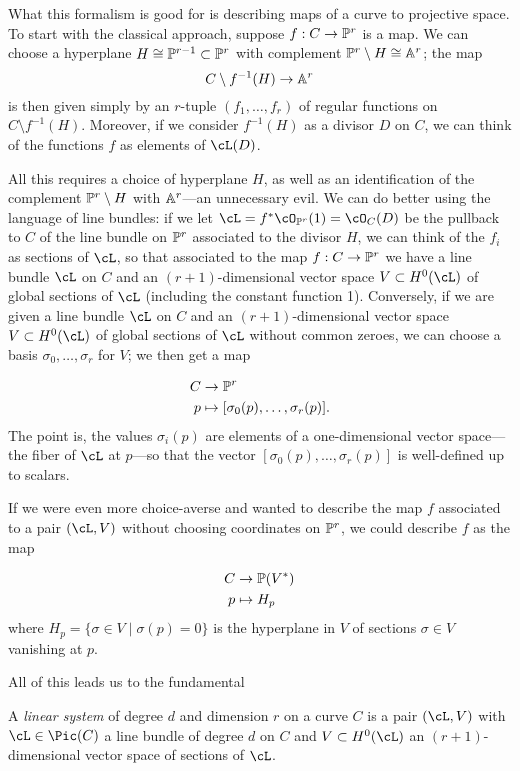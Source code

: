 What this formalism is good for is describing maps of a curve to projective space. To start with the classical approach, suppose $f : C \to \PP^r$ is a map. We can choose a hyperplane $H \cong \PP^{r-1} \subset \PP^r$ with complement $\PP^r \setminus H \cong \AA^r$; the map 
$$
C \setminus f^{-1}(H) \to \AA^r
$$
is then given simply by an $r$-tuple $(f_1,\dots,f_r)$ of regular functions on $C \setminus f^{-1}(H)$. Moreover, if we consider $f^{-1}(H)$ as a divisor $D$ on $C$, we can think of the functions $f$ as elements of $\cL(D)$.

All this requires a choice of hyperplane $H$, as well as an identification of the complement $\PP^r \setminus H$ with $\AA^r$---an unnecessary evil. We can do better using the language of line bundles: if we let $\cL = f^*\cO_{\PP^r}(1) = \cO_C(D)$ be the pullback to $C$ of the line bundle on $\PP^r$ associated to the divisor $H$, we can think of the $f_i$ as sections of $\cL$, so that associated to the map $f : C \to \PP^r$ we have a line bundle $\cL$ on $C$ and an $(r+1)$-dimensional vector space $V \subset H^0(\cL)$ of global sections of $\cL$ (including the constant function 1). Conversely, if we are given a line bundle $\cL$ on $C$ and an $(r+1)$-dimensional vector space $V \subset H^0(\cL)$ of global sections of $\cL$ without common zeroes, we can choose a basis $\sigma_0,\dots,\sigma_r$ for $V$; we then get a map 

\begin{align*}
C &\to \PP^r \\
p &\mapsto [\sigma_0(p),\dots,\sigma_r(p)].
\end{align*}
The point is,  the values $\sigma_i(p)$ are elements of a one-dimensional vector space---the fiber of $\cL$ at $p$---so that the vector $[\sigma_0(p),\dots,\sigma_r(p)]$ is well-defined up to scalars.

If we were even more choice-averse and wanted to describe the map $f$ associated to a pair $(\cL, V)$ without choosing coordinates on $\PP^r$, we could describe $f$ as the map

\begin{align*}
C &\to \PP(V^*) \\
p &\mapsto H_p
\end{align*}
where $H_p = \{\sigma \in V \mid \sigma(p) = 0\}$ is the hyperplane in $V$ of sections $\sigma \in V$ vanishing at $p$.

All of this leads us to the fundamental

\begin{definition}
A \emph{linear system} of degree $d$ and dimension $r$ on a curve $C$ is a pair $(\cL, V)$ with $\cL \in \Pic(C)$ a line bundle of degree $d$ on $C$ and $V \subset H^0(\cL)$ an $(r+1)$-dimensional vector space of sections of $\cL$.
\end{definition}


